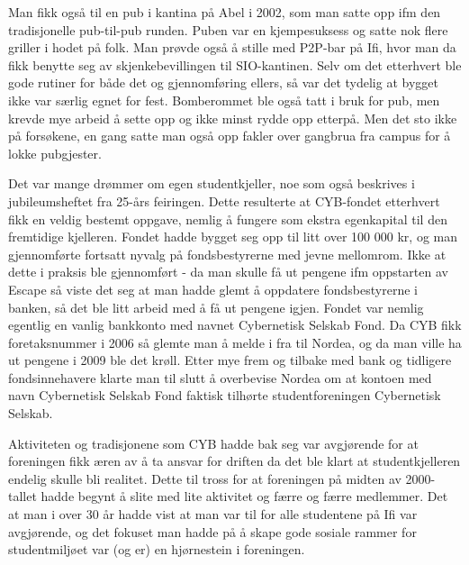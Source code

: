 Man fikk også til en pub i kantina på Abel i 2002, som man satte opp ifm den tradisjonelle pub-til-pub runden. Puben var en kjempesuksess og satte nok flere griller i hodet på folk. Man prøvde også å stille med P2P-bar på Ifi, hvor man da fikk benytte seg av skjenkebevillingen til SIO-kantinen. Selv om det etterhvert ble gode rutiner for både det og gjennomføring ellers, så var det tydelig at bygget ikke var særlig egnet for fest. Bomberommet ble også tatt i bruk for pub, men krevde mye arbeid å sette opp og ikke minst rydde opp etterpå. Men det sto ikke på forsøkene, en gang satte man også opp fakler over gangbrua fra campus for å lokke pubgjester.

Det var mange drømmer om egen studentkjeller, noe som også beskrives i jubileumsheftet fra 25-års feiringen. Dette resulterte at CYB-fondet etterhvert fikk en veldig bestemt oppgave, nemlig å fungere som ekstra egenkapital til den fremtidige kjelleren. Fondet hadde bygget seg opp til litt over 100 000 kr, og man gjennomførte fortsatt nyvalg på fondsbestyrerne med jevne mellomrom. Ikke at dette i praksis ble gjennomført - da man skulle få ut pengene ifm oppstarten av Escape så viste det seg at man hadde glemt å oppdatere fondsbestyrerne i banken, så det ble litt arbeid med å få ut pengene igjen. Fondet var nemlig egentlig en vanlig bankkonto med navnet Cybernetisk Selskab Fond. Da CYB fikk foretaksnummer i 2006 så glemte man å melde i fra til Nordea, og da man ville ha ut pengene i 2009 ble det krøll. Etter mye frem og tilbake med bank og tidligere fondsinnehavere klarte man til slutt å overbevise Nordea om at kontoen med navn Cybernetisk Selskab Fond faktisk tilhørte studentforeningen Cybernetisk Selskab.

Aktiviteten og tradisjonene som CYB hadde bak seg var avgjørende for at foreningen fikk æren av å ta ansvar for driften da det ble klart at studentkjelleren endelig skulle bli realitet. Dette til tross for at foreningen på midten av 2000-tallet hadde begynt å slite med lite aktivitet og færre og færre medlemmer. Det at man i over 30 år hadde vist at man var til for alle studentene på Ifi var avgjørende, og det fokuset man hadde på å skape gode sosiale rammer for studentmiljøet var (og er) en hjørnestein i foreningen.